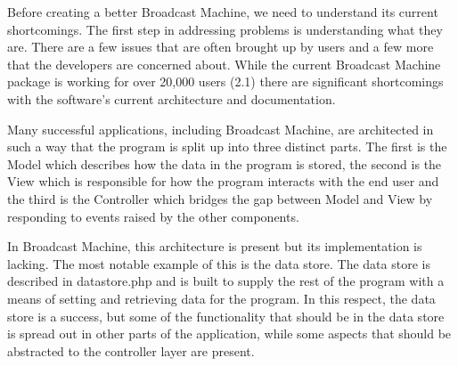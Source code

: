 \documentclass[a4paper,12pt]{report}
\begin{document}


	Before creating a better Broadcast Machine, we need to understand its current shortcomings. The first step in addressing problems is understanding what they are. There are a few issues that are often brought up by users and a few more that the developers are concerned about. While the current Broadcast Machine package is working for over 20,000 users (2.1) there are significant shortcomings with the software's current architecture and documentation.

	Many successful applications, including Broadcast Machine, are architected in such a way that the program is split up into three distinct parts. The first is the Model which describes how the data in the program is stored, the second is the View which is responsible for how the program interacts with the end user and the third is the Controller which bridges the gap between Model and View by responding to events raised by the other components.
	
	In Broadcast Machine, this architecture is present but its implementation is lacking. The most notable example of this is the data store. The data store is described in datastore.php and is built to supply the rest of the program with a means of setting and retrieving data for the program. In this respect, the data store is a success, but some of the functionality that should be in the data store is spread out in other parts of the application, while some aspects that should be abstracted to the controller layer are present.
	
\end{document}
